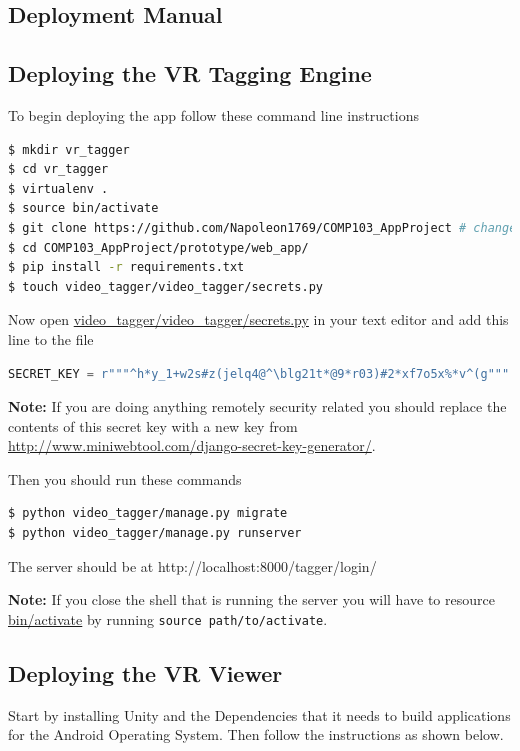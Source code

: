 \documentclass[12pt]{report}
\newcommand{\inlinecode}{\texttt}
\begin{document}
\begin{appendices}

    \chapter{Deployment Manual}
    \section{Deploying the VR Tagging Engine}
    To begin deploying the app follow these command line instructions
    \begin{lstlisting}[language=bash, breaklines]
$ mkdir vr_tagger
$ cd vr_tagger
$ virtualenv .
$ source bin/activate
$ git clone https://github.com/Napoleon1769/COMP103_AppProject # change the URL as needed
$ cd COMP103_AppProject/prototype/web_app/
$ pip install -r requirements.txt
$ touch video_tagger/video_tagger/secrets.py
    \end{lstlisting}
    Now open \url{video_tagger/video_tagger/secrets.py} in your text editor and add this line to the file
    \begin{lstlisting}[language=python, breaklines]
SECRET_KEY = r"""^h*y_1+w2s#z(jelq4@^\blg21t*@9*r03)#2*xf7o5x%*v^(g"""
    \end{lstlisting}
    {\bf Note:} If you are doing anything remotely security related you should
    replace the contents of this secret key with a new key from
    \url{http://www.miniwebtool.com/django-secret-key-generator/}.

    Then you should run these commands 

    \begin{lstlisting}[language=bash, breaklines]
$ python video_tagger/manage.py migrate
$ python video_tagger/manage.py runserver 
    \end{lstlisting}
    The server should be at http://localhost:8000/tagger/login/
    
    {\bf Note:} If you close the shell that is running the server you will have to resource \url{bin/activate} by running \inlinecode{source path/to/activate}.

    \section{Deploying the VR Viewer}

 Start by installing Unity and the Dependencies that it needs to build applications for the Android Operating System. Then follow the instructions as shown below. 


\end{appendices}
\end{document}
